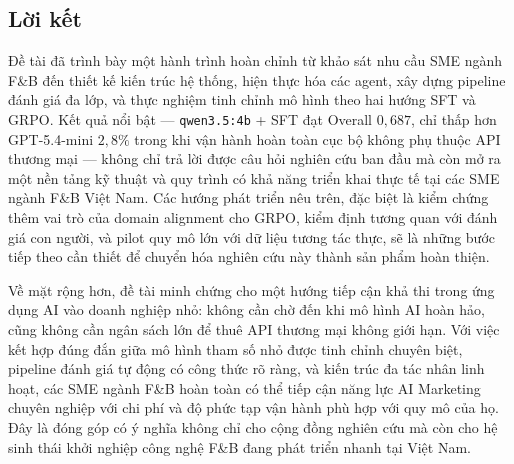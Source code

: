 \subsection{Lời kết}

Đề tài đã trình bày một hành trình hoàn chỉnh từ khảo sát nhu cầu
SME ngành F\&B đến thiết kế kiến trúc hệ thống, hiện thực hóa các
agent, xây dựng pipeline đánh giá đa lớp, và thực nghiệm tinh chỉnh
mô hình theo hai hướng SFT và GRPO. Kết quả nổi bật --- \texttt{qwen3.5:4b}
+ SFT đạt Overall $0{,}687$, chỉ thấp hơn GPT-5.4-mini $2{,}8\%$ trong
khi vận hành hoàn toàn cục bộ không phụ thuộc API thương mại --- không
chỉ trả lời được câu hỏi nghiên cứu ban đầu mà còn mở ra một nền tảng
kỹ thuật và quy trình có khả năng triển khai thực tế tại các SME ngành
F\&B Việt Nam. Các hướng phát triển nêu trên, đặc biệt là kiểm chứng thêm vai trò của
domain alignment cho GRPO, kiểm định tương quan với đánh giá con người,
và pilot quy mô lớn với dữ liệu tương tác thực, sẽ là những bước tiếp
theo cần thiết để chuyển hóa nghiên cứu này thành sản phẩm hoàn thiện.

Về mặt rộng hơn, đề tài minh chứng cho một hướng tiếp cận khả thi trong
ứng dụng AI vào doanh nghiệp nhỏ: không cần chờ đến khi mô hình AI
hoàn hảo, cũng không cần ngân sách lớn để thuê API thương mại không
giới hạn. Với việc kết hợp đúng đắn giữa mô hình tham số nhỏ được tinh
chỉnh chuyên biệt, pipeline đánh giá tự động có công thức rõ ràng, và
kiến trúc đa tác nhân linh hoạt, các SME ngành F\&B hoàn toàn có thể
tiếp cận năng lực AI Marketing chuyên nghiệp với chi phí và độ phức tạp
vận hành phù hợp với quy mô của họ. Đây là đóng góp có ý nghĩa không
chỉ cho cộng đồng nghiên cứu mà còn cho hệ sinh thái khởi nghiệp công
nghệ F\&B đang phát triển nhanh tại Việt Nam.
